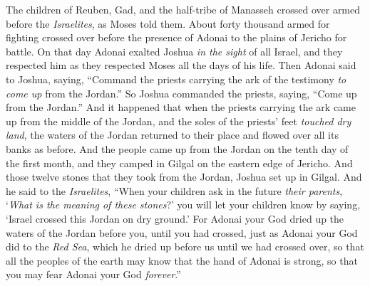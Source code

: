 \begin{biblechapter}
\verse The children of Reuben, Gad, and the half-tribe of Manasseh crossed over armed before the \textit{Israelites}, as Moses told them.
\verse About forty thousand armed for fighting crossed over before the presence of Adonai to the plains of Jericho for battle.
\verse On that day Adonai exalted Joshua \textit{in the sight} of all Israel, and they respected him as they respected Moses all the days of his life.
\verse Then Adonai said to Joshua, saying,
\verse “Command the priests carrying the ark of the testimony \textit{to come up} from the Jordan.”
\verse So Joshua commanded the priests, saying, “Come up from the Jordan.”
\verse And it happened that when the priests carrying the ark came up from the middle of the Jordan, and the soles of the priests’ feet \textit{touched dry land}, the waters of the Jordan returned to their place and flowed over all its banks as before.
\verse And the people came up from the Jordan on the tenth day of the first month, and they camped in Gilgal on the eastern edge of Jericho.
\verse And those twelve stones that they took from the Jordan, Joshua set up in Gilgal.
\verse And he said to the \textit{Israelites}, “When your children ask in the future \textit{their parents}, ‘\textit{What is the meaning of these stones}?’
\verse you will let your children know by saying, ‘Israel crossed this Jordan on dry ground.’
\verse For Adonai your God dried up the waters of the Jordan before you, until you had crossed, just as Adonai your God did to the \textit{Red Sea}, which he dried up before us until we had crossed over,
\verse so that all the peoples of the earth may know that the hand of Adonai is strong, so that you may fear Adonai your God \textit{forever}.”
\end{biblechapter}

